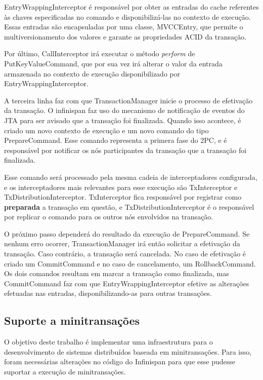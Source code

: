 \documentclass[11pt,twoside,a4paper]{book}
\begin{document}
EntryWrappingInterceptor é responsável por obter as entradas do cache referentes às chaves especificadas no comando e disponibilizá-las no contexto de execução. Essas entradas são encapsuladas por uma classe, MVCCEntry, que permite o multiversionamento dos valores e garante as propriedades ACID da transação.

Por último, CallInterceptor irá executar o método \emph{perform} de PutKeyValueCommand, que por sua vez irá alterar o valor da entrada armazenada no contexto de execução disponibilizado por EntryWrappingInterceptor.

A terceira linha faz com que TransactionManager inicie o processo de efetivação da transação. O infinispan faz uso do mecanismo de notificação de eventos do JTA para ser avisado que a transação foi finalizada. Quando isso acontece, é criado um novo contexto de execução e um novo comando do tipo PrepareCommand. Esse comando representa a primera fase do 2PC, e é responsável por notificar os nós participantes da transação que a transação foi finalizada. 

Esse comando será processado pela mesma cadeia de interceptadores configurada, e os interceptadores mais relevantes para esse execução são TxInterceptor e TxDistributionInterceptor. TxInterceptor fica responsável por registrar como \textbf{preparada} a transação em questão, e TxDistributionInterceptor é o responsável por replicar o comando para os outros nós envolvidos na transação.

O próximo passo dependerá do resultado da execução de PrepareCommand. Se nenhum erro ocorrer, TransactionManager irá então solicitar a efetivação da transação. Caso contrário, a transação será cancelada. No caso de efetivação é criado um CommitCommand e no caso de cancelamento, um RollbackCommand. Os dois comandos resultam em marcar a transação como finalizada, mas CommitCommand faz com que EntryWrappingInterceptor efetive as alterações efetuadas nas entradas, disponibilizando-as para outras transações.

\subsection{Suporte a minitransações}
\label{sec:suporte_mt_infinispan}

O objetivo deste trabalho é implementar uma infraestrutura para o desenvolvimento de sistemas distribuídos baseada em minitransações. Para isso, foram necessárias alterações no código do Infinispan para que esse pudesse suportar a execução de minitransações.
\end{document}

